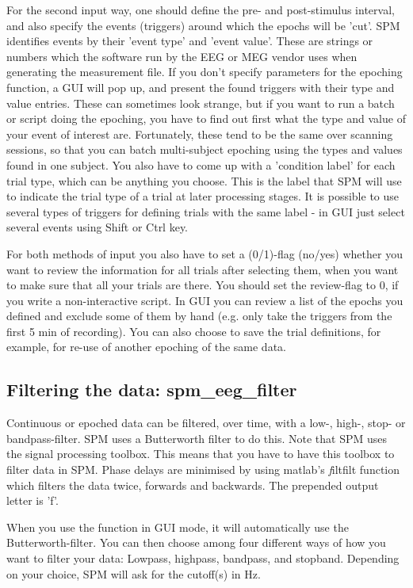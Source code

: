 For the second input way, one should define the pre- and post-stimulus interval, and also specify
the events (triggers) around which the epochs will be 'cut'. SPM identifies events by their 'event type' and 
'event value'. These are strings or numbers 
which the software run by the EEG or MEG vendor uses when generating the measurement file. 
If you don't specify parameters for the epoching function, a GUI will pop up, and present
the found triggers with their type and value entries. These can sometimes look strange, 
but if you want to run a batch or script doing the epoching, you have to find out first what
the type and value of your event of interest are. Fortunately, these tend to be the same over scanning sessions, 
so that you can batch multi-subject epoching using the types and values found in one subject. 
You also have to come up with a 'condition label' for each trial type, which can be anything 
you choose. This is the label that SPM will use to indicate the trial type of a trial at later
processing stages. It is possible to use several types of triggers for defining trials with the
same label - in GUI just select several events using Shift or Ctrl key.

For both methods of input you also have to set a (0/1)-flag (no/yes) whether you 
want to review the information for all trials after selecting them, when you want
to make sure that all your trials are there. You should set the review-flag to 0,
if you write a non-interactive script. In GUI you can review a list of the epochs you defined
and exclude some of them by hand (e.g. only take the triggers from the first 5 min of recording).
You can also choose to save the trial definitions, for example, for re-use of another epoching of the same data.

\subsection{Filtering the data: spm\_eeg\_filter}
Continuous or epoched data can be filtered, over time, with a low-,
high-, stop- or bandpass-filter. SPM uses a Butterworth filter to do this. Note that
SPM uses the signal processing toolbox. This means that you have to
have this toolbox to filter data in SPM. Phase delays are minimised by
using matlab's {\textit filtfilt} function which filters the data
twice, forwards and backwards. The prepended output letter is 'f'.

When you use the function in GUI mode, it will automatically 
use the Butterworth-filter. You can then choose among four different 
ways of how you want to filter your data: Lowpass, highpass, bandpass,
and stopband. Depending on your choice, SPM will ask for the cutoff(s) in Hz.


